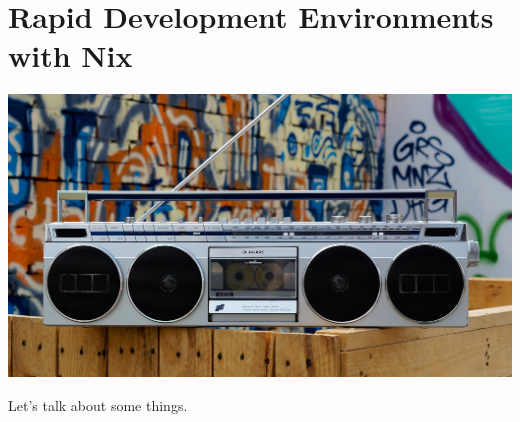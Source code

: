 \chapter{Rapid Development Environments with Nix}

\includegraphics[scale=0.85]{../images/boombox-5693150_1920.jpg}

Let's talk about some things.